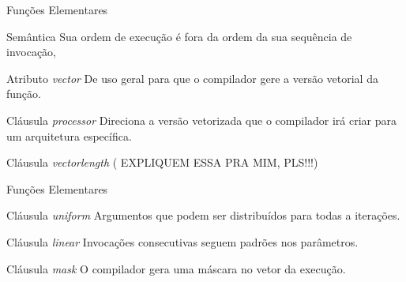 \documentclass{beamer}
\begin{document}
\begin{frame}{Funções Elementares}
\begin{block}{Semântica}
    Sua ordem de execução é fora da ordem da sua sequência de invocação, 
\end{block}
\begin{block}{Atributo \textit{vector}}
    De uso geral para que o compilador gere a versão vetorial da função.
\end{block}
\begin{block}{Cláusula \textit{processor}}
    Direciona a versão vetorizada que o compilador irá criar para um arquitetura específica.
\end{block}
\begin{block}{Cláusula \textit{vectorlength}}
    ( EXPLIQUEM ESSA PRA MIM, PLS!!!)
\end{block}
\end{frame}
\begin{frame}{Funções Elementares}
\begin{block}{Cláusula \textit{uniform}}
    Argumentos que podem ser distribuídos para todas a iterações.
\end{block}
\begin{block}{Cláusula \textit{linear}}
    Invocações consecutivas seguem padrões nos parâmetros.
\end{block}
\begin{block}{Cláusula \textit{mask}}
    O compilador gera uma máscara no vetor da execução.
\end{block}
\end{frame}
\end{document}
